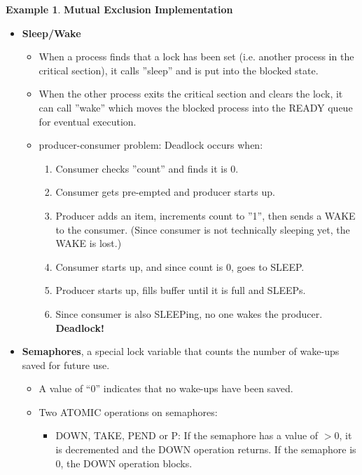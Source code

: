 \documentclass[12pt,a4paper]{article}
\theoremstyle{definition}
\newtheorem{example}{Example}[section]
\newenvironment{myitemize}
{ \begin{itemize}
    \setlength{\itemsep}{5pt}
    \setlength{\parskip}{0pt}
    \setlength{\parsep}{0pt}     }
{ \end{itemize}                  }
\newenvironment{myenumerate}
{ \begin{enumerate}
    \setlength{\itemsep}{5pt}
    \setlength{\parskip}{0pt}
    \setlength{\parsep}{0pt}     }
{ \end{enumerate}                }
\begin{document}
\begin{example}{\textbf{Mutual Exclusion Implementation}}
\begin{myitemize}
\begin{tcolorbox}
			\textbf{**Rescue for Peterson}: by using \textsf{turn}, which can be either 0 or 1, we prevent both process stuck and busy waiting, one of them will execute the critical section and then leave and make \textsf{interested = FALSE}. (as shown in the above code)
		\end{tcolorbox}
		\item \textbf{Sleep/Wake}
		\begin{myitemize}
			\item When a process finds that a lock has been set (i.e. another process in the critical section), it calls ''sleep'' and is put into the blocked state.
			\item When the other process exits the critical section and clears the lock, it can call ''wake'' which moves the blocked process into the READY queue for eventual execution.
		\end{myitemize}
		\begin{myitemize}
			\item \textsf{producer-consumer problem}: Deadlock occurs when:
			\begin{myenumerate}
				\item Consumer checks ''count'' and finds it is 0.
				\item Consumer gets pre-empted and producer starts up.
				\item Producer adds an item, increments count to ''1'', then sends  a WAKE to the consumer. (Since consumer is not technically sleeping yet, the WAKE is lost.)
				\item Consumer starts up, and since count is 0, goes to SLEEP.
				\item Producer starts up, fills buffer until it is full and SLEEPs.
				\item Since consumer is also SLEEPing, no one wakes the producer. \textbf{Deadlock!}
			\end{myenumerate}
		\end{myitemize}
		\item \textbf{Semaphores}, a special lock variable that counts the number of wake-ups saved for future use.
		\begin{myitemize}
			\item  A value of “0” indicates that no wake-ups have been saved.
			\item Two ATOMIC operations on semaphores:
			\begin{myitemize}
				\item DOWN, TAKE, PEND or P: If the semaphore has a value of $>0$, it is decremented and the DOWN operation returns. If the semaphore is 0, the DOWN operation blocks.

\end{myitemize}
\end{myitemize}
\end{myitemize}
\end{example}
\end{document}
